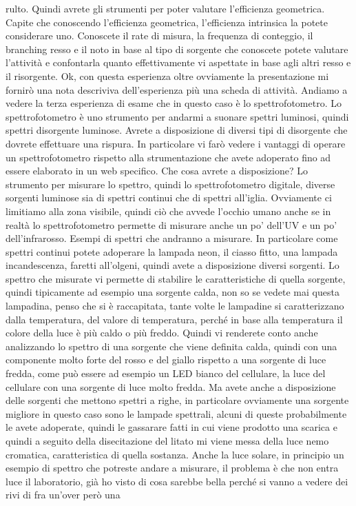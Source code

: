 {rulto. Quindi avrete gli strumenti per poter valutare l'efficienza geometrica. Capite che conoscendo l'efficienza geometrica, l'efficienza intrinsica la potete considerare uno. Conoscete il rate di misura, la frequenza di conteggio, il branching resso e il noto in base al tipo di sorgente che conoscete potete valutare l'attività e confontarla quanto effettivamente vi aspettate in base agli altri resso e il risorgente. Ok, con questa esperienza oltre ovviamente la presentazione mi fornirò una nota descriviva dell'esperienza più una scheda di attività. Andiamo a vedere la terza esperienza di esame che in questo caso è lo spettrofotometro. Lo spettrofotometro è uno strumento per andarmi a suonare spettri luminosi, quindi spettri disorgente luminose. Avrete a disposizione di diversi tipi di disorgente che dovrete effettuare una rispura. In particolare vi farò vedere i vantaggi di operare un spettrofotometro rispetto alla strumentazione che avete adoperato fino ad essere elaborato in un web specifico. Che cosa avrete a disposizione? Lo strumento per misurare lo spettro, quindi lo spettrofotometro digitale, diverse sorgenti luminose sia di spettri continui che di spettri all'iglia. Ovviamente ci limitiamo alla zona visibile, quindi ciò che avvede l'occhio umano anche se in realtà lo spettrofotometro permette di misurare anche un po' dell'UV e un po' dell'infrarosso. Esempi di spettri che andranno a misurare. In particolare come spettri continui potete adoperare la lampada neon, il ciasso fitto, una lampada incandescenza, faretti all'olgeni, quindi avete a disposizione diversi sorgenti. Lo spettro che misurate vi permette di stabilire le caratteristiche di quella sorgente, quindi tipicamente ad esempio una sorgente calda, non so se vedete mai questa lampadina, penso che si è raccapitata, tante volte le lampadine si caratterizzano dalla temperatura, del valore di temperatura, perché in base alla temperatura il colore della luce è più caldo o più freddo. Quindi vi renderete conto anche analizzando lo spettro di una sorgente che viene definita calda, quindi con una componente molto forte del rosso e del giallo rispetto a una sorgente di luce fredda, come può essere ad esempio un LED bianco del cellulare, la luce del cellulare con una sorgente di luce molto fredda. Ma avete anche a disposizione delle sorgenti che mettono spettri a righe, in particolare ovviamente una sorgente migliore in questo caso sono le lampade spettrali, alcuni di queste probabilmente le avete adoperate, quindi le gassarare fatti in cui viene prodotto una scarica e quindi a seguito della disecitazione del litato mi viene messa della luce nemo cromatica, caratteristica di quella sostanza. Anche la luce solare, in principio un esempio di spettro che potreste andare a misurare, il problema è che non entra luce il laboratorio, già ho visto di cosa sarebbe bella perché si vanno a vedere dei rivi di fra un'over però una

}
